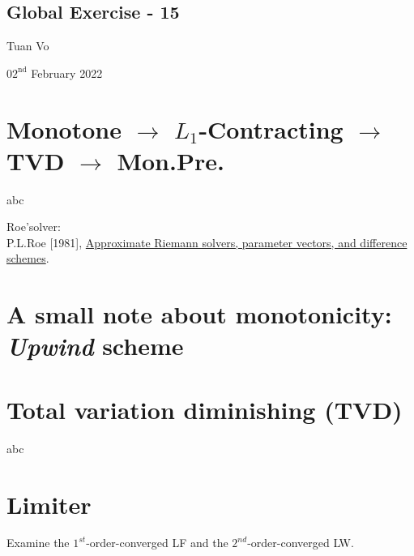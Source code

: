 \documentclass[12pt]{article}
\begin{document}
\begin{center}
	\section*{Global Exercise - 15}
\end{center}
\begin{center}
	Tuan Vo
\end{center}
\begin{center}
	$02^{\text{nd}}$ February 2022
\end{center}

\section{Monotone $\rightarrow$ $L_1$-Contracting $\rightarrow$ TVD $\rightarrow$ Mon.Pre.}
\begin{example}
	abc
\end{example}
Roe'solver:\\
P.L.Roe [1981], 
\href{https://www.sciencedirect.com/science/article/pii/0021999181901285}
{Approximate Riemann solvers, parameter vectors, and difference schemes}.

\clearpage
\section{A small note about monotonicity: \emph{Upwind} scheme}

\clearpage
\section{Total variation diminishing (TVD)}
\begin{example}
	abc
\end{example}

\clearpage
\section{Limiter}
\begin{example}
	Examine the $1^{st}$-order-converged LF and the $2^{nd}$-order-converged LW.
\end{example}
\end{document}
